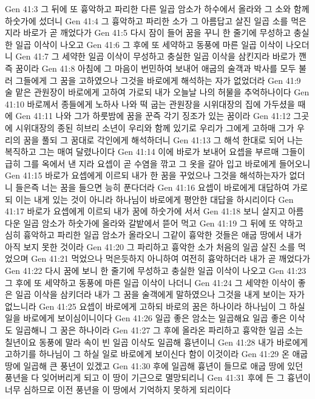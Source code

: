 Gen 41:3  그 뒤에 또 흉악하고 파리한 다른 일곱 암소가 하수에서 올라와 그 소와 함께 하숫가에 섰더니
Gen 41:4  그 흉악하고 파리한 소가 그 아름답고 살진 일곱 소를 먹은지라 바로가 곧 깨었다가
Gen 41:5  다시 잠이 들어 꿈을 꾸니 한 줄기에 무성하고 충실한 일곱 이삭이 나오고
Gen 41:6  그 후에 또 세약하고 동풍에 마른 일곱 이삭이 나오더니
Gen 41:7  그 세약한 일곱 이삭이 무성하고 충실한 일곱 이삭을 삼킨지라 바로가 깬즉 꿈이라
Gen 41:8  아침에 그 마음이 번민하여 보내어 애굽의 술객과 박사를 모두 불러 그들에게 그 꿈을 고하였으나 그것을 바로에게 해석하는 자가 없었더라
Gen 41:9  술 맡은 관원장이 바로에게 고하여 가로되 내가 오늘날 나의 허물을 추억하나이다
Gen 41:10  바로께서 종들에게 노하사 나와 떡 굽는 관원장을 시위대장의 집에 가두셨을 때에
Gen 41:11  나와 그가 하룻밤에 꿈을 꾼즉 각기 징조가 있는 꿈이라
Gen 41:12  그곳에 시위대장의 종된 히브리 소년이 우리와 함께 있기로 우리가 그에게 고하매 그가 우리의 꿈을 풀되 그 꿈대로 각인에게 해석하더니
Gen 41:13  그 해석 한대로 되어 나는 복직하고 그는 매여 달렸나이다
Gen 41:14  이에 바로가 보내어 요셉을 부르매 그들이 급히 그를 옥에서 낸 지라 요셉이 곧 수염을 깎고 그 옷을 갈아 입고 바로에게 들어오니
Gen 41:15  바로가 요셉에게 이르되 내가 한 꿈을 꾸었으나 그것을 해석하는자가 없더니 들은즉 너는 꿈을 들으면 능히 푼다더라
Gen 41:16  요셉이 바로에게 대답하여 가로되 이는 내게 있는 것이 아니라 하나님이 바로에게 평안한 대답을 하시리이다
Gen 41:17  바로가 요셉에게 이르되 내가 꿈에 하숫가에 서서
Gen 41:18  보니 살지고 아름다운 일곱 암소가 하숫가에 올라와 갈밭에서 뜯어 먹고
Gen 41:19  그 뒤에 또 약하고 심히 흉악하고 파리한 일곱 암소가 올라오니 그같이 흉악한 것들은 애굽 땅에서 내가 아직 보지 못한 것이라
Gen 41:20  그 파리하고 흉악한 소가 처음의 일곱 살진 소를 먹었으며
Gen 41:21  먹었으나 먹은듯하지 아니하여 여전히 흉악하더라 내가 곧 깨었다가
Gen 41:22  다시 꿈에 보니 한 줄기에 무성하고 충실한 일곱 이삭이 나오고
Gen 41:23  그 후에 또 세약하고 동풍에 마른 일곱 이삭이 나더니
Gen 41:24  그 세약한 이삭이 좋은 일곱 이삭을 삼키더라 내가 그 꿈을 술객에게 말하였으나 그것을 내게 보이는 자가 없느니라
Gen 41:25  요셉이 바로에게 고하되 바로의 꿈은 하나이라 하나님이 그 하실일을 바로에게 보이심이니이다
Gen 41:26  일곱 좋은 암소는 일곱해요 일곱 좋은 이삭도 일곱해니 그 꿈은 하나이라
Gen 41:27  그 후에 올라온 파리하고 흉악한 일곱 소는 칠년이요 동풍에 말라 속이 빈 일곱 이삭도 일곱해 흉년이니
Gen 41:28  내가 바로에게 고하기를 하나님이 그 하실 일로 바로에게 보이신다 함이 이것이라
Gen 41:29  온 애굽 땅에 일곱해 큰 풍년이 있겠고
Gen 41:30  후에 일곱해 흉년이 들므로 애굽 땅에 있던 풍년을 다 잊어버리게 되고 이 땅이 기근으로 멸망되리니
Gen 41:31  후에 든 그 흉년이 너무 심하므로 이전 풍년을 이 땅에서 기억하지 못하게 되리이다
